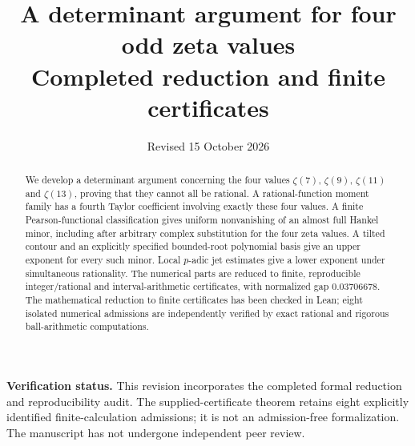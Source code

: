 \documentclass[11pt]{article}
\title{A determinant argument for four odd zeta values\\[3pt]\large Completed reduction and finite certificates}
\author{}
\date{Revised 15 October 2026}
\theoremstyle{definition}\newtheorem{definition}[theorem]{Definition}
\theoremstyle{remark}\newtheorem{remark}[theorem]{Remark}
\begin{document}
\maketitle
\begin{abstract}
We develop a determinant argument concerning the four values
$\zeta(7)$, $\zeta(9)$, $\zeta(11)$ and $\zeta(13)$, proving that they
cannot all be rational.  A rational-function moment family
has a fourth Taylor coefficient involving exactly these four values.
A finite Pearson-functional classification gives uniform nonvanishing of
an almost full Hankel minor, including after arbitrary complex substitution
for the four zeta values.  A tilted contour and an explicitly specified
bounded-root polynomial basis give an upper exponent for every such minor.
Local $p$-adic jet estimates give a lower exponent under simultaneous
rationality.  The numerical parts are reduced to finite, reproducible
integer/rational and interval-arithmetic certificates, with normalized
gap $0.03706678$. The mathematical reduction to finite certificates has
been checked in Lean; eight isolated numerical admissions are independently
verified by exact rational and rigorous ball-arithmetic computations.
\end{abstract}
\noindent\textbf{Verification status.}
This revision incorporates the completed formal reduction and reproducibility
audit. The supplied-certificate theorem retains eight explicitly identified
finite-calculation admissions; it is not an admission-free formalization.
The manuscript has not undergone independent peer review.
\clearpage
\begingroup
\setcounter{tocdepth}{1}
\tableofcontents
\endgroup
\clearpage
\end{document}
